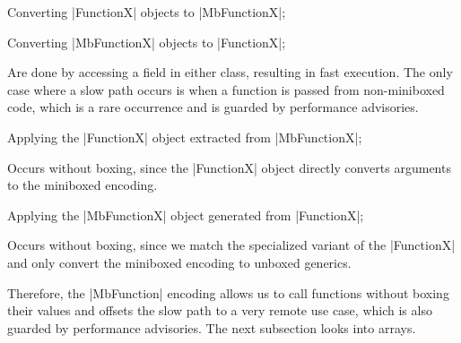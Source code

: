 \begin{compactitem}
  \item Converting |FunctionX| objects to |MbFunctionX|;
  \item Converting |MbFunctionX| objects to |FunctionX|;
  \begin{compactitem}
    \item Are done by accessing a field in either class, resulting in fast execution. The only case where a slow path occurs is when a function is passed from non-miniboxed code, which is a rare occurrence and is guarded by performance advisories.
  \end{compactitem}
  \item Applying the |FunctionX| object extracted from |MbFunctionX|;
  \begin{compactitem}
    \item Occurs without boxing, since the |FunctionX| object directly converts arguments to the miniboxed encoding.
  \end{compactitem}
  \item Applying the |MbFunctionX| object generated from |FunctionX|;
  \begin{compactitem}
    \item Occurs without boxing, since we match the specialized variant of the |FunctionX| and only convert the miniboxed encoding to unboxed generics.
  \end{compactitem}
\end{compactitem}



Therefore, the |MbFunction| encoding allows us to call functions without boxing their values and offsets the slow path to a very remote use case, which is also guarded by performance advisories. The next subsection looks into arrays.

